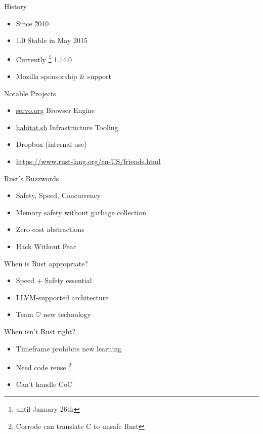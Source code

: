 \documentclass[xcolor={svgnames},hyperref]{beamer}
\begin{document}
    \begin{frame}
        History
        \begin{itemize}
            \item Since \~2010
            \item 1.0 Stable in May 2015
            \item Currently \footnote{until January 26th} 1.14.0
            \item Mozilla sponsorship \& support
        \end{itemize}
    \end{frame}

    \begin{frame}
        Notable Projects
        \begin{itemize}
            \item \url{servo.org} Browser Engine
            \item \url{habitat.sh} Infrastructure Tooling
            \item Dropbox (internal use)
            \item \url{https://www.rust-lang.org/en-US/friends.html}
        \end{itemize}
    \end{frame}

    \begin{frame}
        Rust's Buzzwords
        \begin{itemize}
            \item Safety, Speed, Concurrency
            \item Memory safety without garbage collection
            \item Zero-cost abstractions
            \item Hack Without Fear
        \end{itemize}
    \end{frame}

    \begin{frame}
        When is Rust appropriate?
        \begin{itemize}
            \item Speed + Safety essential
            \item LLVM-supported architecture
            \item Team $\heartsuit$ new technology
        \end{itemize}
    \end{frame}

    \begin{frame}
        When isn't Rust right?
        \begin{itemize}
            \item Timeframe prohibits new learning
            \item Need code reuse \footnote{Corrode can translate C to unsafe Rust}
            \item Can't handle CoC
        \end{itemize}
    \end{frame}
\end{document}
